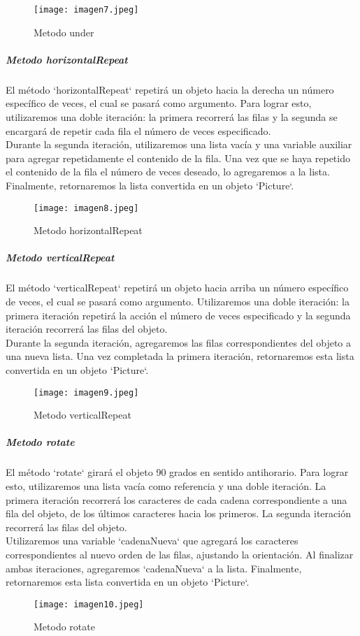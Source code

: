 \documentclass[10pt, a4paper]{article}
\begin{document}
		\begin{figure}[h]
			\centering
			\texttt{[image: imagen7.jpeg]}
			\caption{Metodo under}
		\end{figure}
		\vspace*{4cm}
	\subparagraph*{Metodo horizontalRepeat}
		\begin{flushleft}
			El método `horizontalRepeat` repetirá un objeto hacia la derecha un número específico de veces, el cual se pasará como argumento. Para lograr esto, utilizaremos una doble iteración: la primera recorrerá las filas y la segunda se encargará de repetir cada fila el número de veces especificado. \\
			Durante la segunda iteración, utilizaremos una lista vacía y una variable auxiliar para agregar repetidamente el contenido de la fila. Una vez que se haya repetido el contenido de la fila el número de veces deseado, lo agregaremos a la lista. \\
			Finalmente, retornaremos la lista convertida en un objeto `Picture`.
		\end{flushleft}
		\begin{figure}[h]
			\centering
			\texttt{[image: imagen8.jpeg]}
			\caption{Metodo horizontalRepeat}
		\end{figure}
	\subparagraph*{Metodo verticalRepeat}
		\begin{flushleft}
			El método `verticalRepeat` repetirá un objeto hacia arriba un número específico de veces, el cual se pasará como argumento. Utilizaremos una doble iteración: la primera iteración repetirá la acción el número de veces especificado y la segunda iteración recorrerá las filas del objeto. \\		
			Durante la segunda iteración, agregaremos las filas correspondientes del objeto a una nueva lista. Una vez completada la primera iteración, retornaremos esta lista convertida en un objeto `Picture`.
		\end{flushleft}
		\begin{figure}[h]
			\centering
			\texttt{[image: imagen9.jpeg]}
			\caption{Metodo verticalRepeat}
		\end{figure}
		\vspace{5cm}
	\subparagraph*{Metodo rotate}
		\begin{flushleft}
		El método `rotate` girará el objeto 90 grados en sentido antihorario. Para lograr esto, utilizaremos una lista vacía como referencia y una doble iteración. La primera iteración recorrerá los caracteres de cada cadena correspondiente a una fila del objeto, de los últimos caracteres hacia los primeros. La segunda iteración recorrerá las filas del objeto. \\
		Utilizaremos una variable `cadenaNueva` que agregará los caracteres correspondientes al nuevo orden de las filas, ajustando la orientación. Al finalizar ambas iteraciones, agregaremos `cadenaNueva` a la lista. Finalmente, retornaremos esta lista convertida en un objeto `Picture`.
		\end{flushleft}
		\begin{figure}[h]
			\centering
			\texttt{[image: imagen10.jpeg]}
			\caption{Metodo rotate}
		\end{figure}
\end{document}
